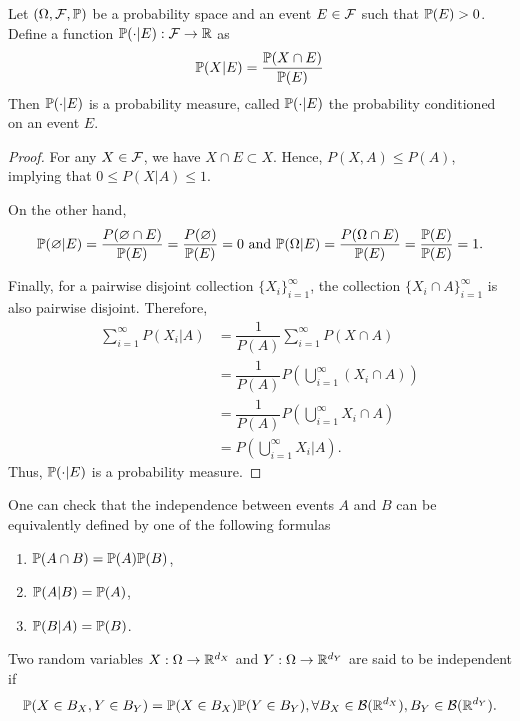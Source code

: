 \begin{theorem}
 Let $(\Omega, \mathcal{F},\mathbb{P})$ be a probability space and an event $E\in\mathcal{F}$ such that $\mathbb{P}(E)>0$. Define a function $\mathbb{P}(\cdot|E):\mathcal{F}\to\mathbb{R}$ as
 \begin{equation}
  \mathbb{P}(X|E) = \dfrac{\mathbb{P}(X\cap E)}{\mathbb{P}(E)}
 \end{equation}
 Then $\mathbb{P}(\cdot|E)$ is a probability measure, called $\mathbb{P}(\cdot|E)$ the probability conditioned on an event $E$.
\end{theorem}

\begin{proof}
 For any $X\in\mathcal{F}$, we have $X\cap E\subset X$. Hence, $P(X,A)\le P(A)$, implying that $0\le P(X|A)\le 1.$

 On the other hand,
 $$\mathbb{P}(\varnothing | E)=\dfrac{P(\varnothing\cap E)}{\mathbb{P}(E)} = \dfrac{P(\varnothing)}{\mathbb{P}(E)}=0 \text{ and } \mathbb{P}(\Omega | E) =\dfrac{P(\Omega\cap E)}{\mathbb{P}(E)} = \dfrac{\mathbb{P}(E)}{\mathbb{P}(E)} = 1.$$

 Finally, for a pairwise disjoint collection $\{X_i\}_{i=1}^\infty$, the collection $\{X_i\cap A\}_{i=1}^\infty$ is also pairwise disjoint. Therefore,
 \begin{align*}
  \sum\limits_{i=1}^\infty P(X_i|A)
   & = \dfrac{1}{P(A)}\sum\limits_{i=1}^\infty P(X\cap A)                  \\
   & =\dfrac{1}{P(A)}P\left(\bigcup\limits_{i=1}^\infty (X_i\cap A)\right) \\
   & =\dfrac{1}{P(A)}P\left(\bigcup\limits_{i=1}^\infty X_i \cap A \right) \\
   & = P\left(\bigcup\limits_{i=1}^\infty X_i|A\right).
 \end{align*}
 Thus, $\mathbb{P}(\cdot|E)$ is a probability measure.
\end{proof}

\begin{remark}
 One can check that the independence between events $A$ and $B$ can be equivalently defined by one of the following formulas
 \begin{enumerate}[label=(\arabic*)]
  \item $\mathbb{P}(A \cap B)=\mathbb{P}(A)\mathbb{P}(B)$,
  \item $\mathbb{P}(A | B)=\mathbb{P}(A)$,
  \item $\mathbb{P}(B | A)=\mathbb{P}(B)$.
 \end{enumerate}
\end{remark}

\begin{definition}
 Two random variables $X:\Omega\to\mathbb{R}^{d_X}$ and $Y:\Omega\to\mathbb{R}^{d_Y}$ are said to be independent if
 \begin{equation}
  \label{definition:independent-random-variables}
  \mathbb{P}(X\in B_X, Y\in B_Y)=\mathbb{P}(X\in B_X)\mathbb{P}(Y\in B_Y), \forall B_X\in\mathcal{B}(\mathbb{R}^{d_X}), B_Y\in\mathcal{B}(\mathbb{R}^{d_Y}).
 \end{equation}
\end{definition}

